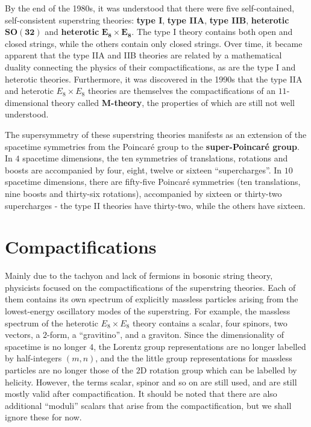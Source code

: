 \documentclass[12pt]{article}
\begin{document}
By the end of the 1980s, it was understood that there were five self-contained, self-consistent superstring theories: \textbf{type I}, \textbf{type IIA}, \textbf{type IIB}, \textbf{heterotic} $\mathbf{SO(32)}$ and \textbf{heterotic} $\mathbf{E_8 \times E_8}$. The type I theory contains both open and closed strings, while the others contain only closed strings. Over time, it became apparent that the type IIA and IIB theories are related by a mathematical duality connecting the physics of their compactifications, as are the type I and heterotic theories. Furthermore, it was discovered in the 1990s that the type IIA and heterotic $E_8 \times E_8$ theories are themselves the compactifications of an $11$-dimensional theory called \textbf{M-theory}, the properties of which are still not well understood.
\newline

The supersymmetry of these superstring theories manifests as an extension of the spacetime symmetries from the Poincaré group to the \textbf{super-Poincaré group}. In $4$ spacetime dimensions, the ten symmetries of translations, rotations and boosts are accompanied by four, eight, twelve or sixteen ``supercharges''. In $10$ spacetime dimensions, there are fifty-five Poincaré symmetries (ten translations, nine boosts and thirty-six rotations), accompanied by sixteen or thirty-two supercharges - the type II theories have thirty-two, while the others have sixteen.

\section{Compactifications}

Mainly due to the tachyon and lack of fermions in bosonic string theory, physicists focused on the compactifications of the superstring theories. Each of them contains its own spectrum of explicitly massless particles arising from the lowest-energy oscillatory modes of the superstring. For example, the massless spectrum of the heterotic $E_8 \times E_8$ theory contains a scalar, four spinors, two vectors, a $2$-form, a ``gravitino'', and a graviton. Since the dimensionality of spacetime is no longer $4$, the Lorentz group representations are no longer labelled by half-integers $\left(m,n\right)$, and the the little group representations for massless particles are no longer those of the $2$D rotation group which can be labelled by helicity. However, the terms scalar, spinor and so on are still used, and are still mostly valid after compactification. It should be noted that there are also additional ``moduli'' scalars that arise from the compactification, but we shall ignore these for now.
\newline
\end{document}
